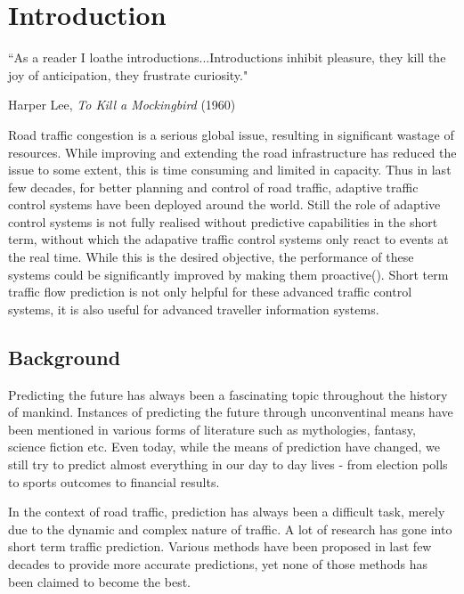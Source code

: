 

\chapter{Introduction} %

\label{Chapter1} %


{``As a reader I loathe introductions...Introductions inhibit pleasure, they kill the joy of
anticipation, they frustrate curiosity."}
\begin{flushright}
Harper Lee, \textit{To Kill a Mockingbird} (1960)
\end{flushright}

Road traffic congestion is a serious global issue, resulting in significant wastage of resources.
While improving and extending the road infrastructure has reduced the issue to some extent, this is
time consuming and limited in capacity. Thus in last few decades, for better planning and control
of road traffic, adaptive traffic control systems have been deployed around the world. Still the
role of adaptive control systems is not fully realised without predictive capabilities in the
short term, without which the adapative traffic control systems only react to events at the real
time. While this is the desired objective, the performance of these systems could be significantly
improved by making them proactive(\citet{smith1997traffic}). Short term traffic flow prediction
is not only helpful for these advanced traffic control systems, it is also useful for advanced
traveller information systems.

\section{Background}
Predicting the future has always been a fascinating topic throughout the history of mankind.
Instances of predicting the future through unconventinal means have been mentioned in various
forms of literature such as mythologies, fantasy, science fiction etc. Even today, while the
means of prediction have changed, we still try to predict almost everything in our day to day
lives - from election polls to sports outcomes to financial results.

In the context of road traffic, prediction has always been a difficult task, merely due to the
dynamic and complex nature of traffic. A lot of research has gone into short term
traffic prediction. Various methods have been proposed in last few decades to provide more
accurate predictions, yet none of those methods has been claimed to become the best.

